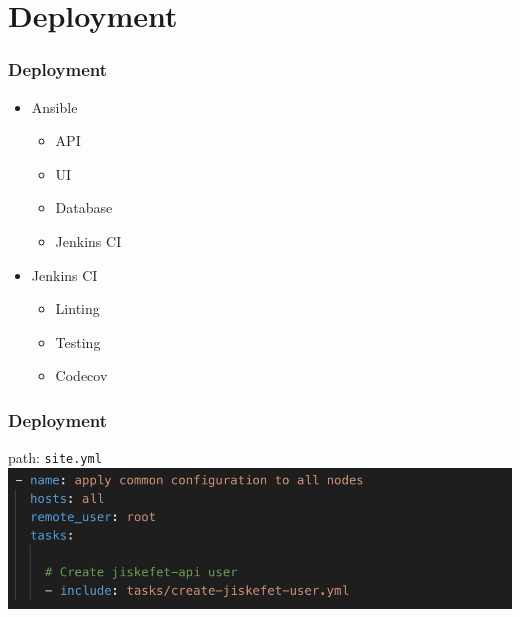 \documentclass[12pt]{beamer}
\begin{document}
	\section{Deployment}
	\begin{frame}
		\frametitle{Deployment}
		\begin{itemize}
			\item Ansible
			\begin{itemize}
                \item API
                \item UI
                \item Database
                \item Jenkins CI
            \end{itemize} 
			\item Jenkins CI
            \begin{itemize}
                \item Linting
                \item Testing
                \item Codecov
            \end{itemize}
		\end{itemize}
    \end{frame}

    \begin{frame}
		\frametitle{Deployment}
        path: \texttt{site.yml}
        \newline
   		\includegraphics[scale=.40]{assets/deploy_create_user.png}
    \end{frame}
    
\end{document}

